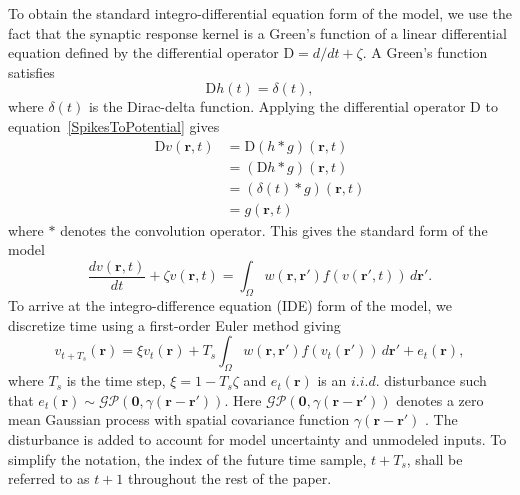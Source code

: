 \documentclass[conference,onecolumn]{IEEEtran}
\begin{document}
To obtain the standard integro-differential equation form of the model, we use the fact that the synaptic response kernel is a Green's function of a linear differential equation defined by the differential operator $\textrm{D}=d/dt + \zeta$. A Green's function satisfies
\begin{equation}
	\label{GreensFuncDef} \textrm{D}h\left( t \right) = \delta \left( t \right), 
\end{equation} 
where $\delta(t)$ is the Dirac-delta function. Applying the differential operator $\textrm{D}$ to equation~\ref{SpikesToPotential} gives
\begin{align}
 \textrm{D}v\left(\mathbf r,t\right)&= \textrm{D}\left(h\ast g\right)\left(\mathbf r,t\right)\\
&=\left(\textrm{D}h\ast g\right)\left(\mathbf r,t\right)\\
&=\left(\delta \left(t\right)\ast g\right)\left(\mathbf r,t\right)\\
&=g\left(\mathbf r,t\right)
\end{align}
where $\ast$ denotes the convolution operator. This gives the standard form of the model
\begin{equation}
	\label{FinalFormContinuous} 
	\frac{dv\left( \mathbf{r},t \right)}{dt} + \zeta v\left( \mathbf{r},t \right) = \int_\Omega {w\left( \mathbf{r},\mathbf{r}' \right)f\left( {v\left( \mathbf{r}',t \right)} \right)\, d\mathbf{r}'}. 
\end{equation}
To arrive at the integro-difference equation (IDE) form of the model, we discretize time using a first-order Euler method giving 
\begin{equation}
	\label{eq:DiscreteTimeModel} 
	v_{t+T_s}\left(\mathbf{r}\right) = 
	\xi v_t\left(\mathbf{r}\right) + 
	T_s \int_\Omega { 
	    w\left(\mathbf{r},\mathbf{r}'\right)
	    f\left(v_t\left(\mathbf{r}'\right)\right) 
	\, d\mathbf{r}'} 
	+ e_t\left(\mathbf{r}\right), 
\end{equation}
where $T_s$ is the time step, $\xi = 1-T_s\zeta $ and $e_t(\mathbf{r})$ is an $i.i.d.$ disturbance such that $e_t(\mathbf{r})\sim\mathcal{GP}(\mathbf 0,\gamma(\mathbf{r}-\mathbf{r}'))$. Here $\mathcal{GP}(\mathbf 0,\gamma(\mathbf{r}-\mathbf{r}'))$ denotes a zero mean Gaussian process with spatial covariance function $\gamma(\mathbf{r}-\mathbf{r}')$ \cite{Rasmussen2005}. The disturbance is added to account for model uncertainty and unmodeled inputs. To simplify the notation, the index of the future time sample, $t+T_s$, shall be referred to as $t+1$ throughout the rest of the paper. 
\end{document}
